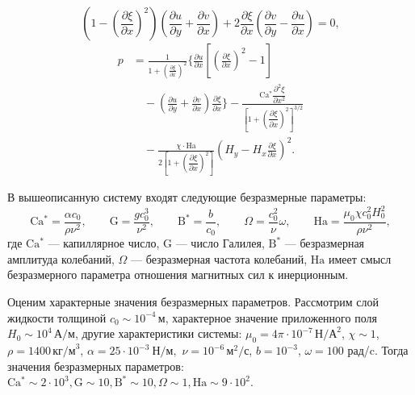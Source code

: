 \documentclass[12pt,a4paper]{article}
\begin{document}
\begin{equation}
\left(
1-
\left(\frac{\partial \xi}{\partial x}\right)^2
\right)
\left(
\frac{\partial u}{\partial y}
+
\frac{\partial v}{\partial x}
\right)
+
2\frac{\partial \xi}{\partial x}
\left(
\frac{\partial v}{\partial y}
-
\frac{\partial u}{\partial x}
\right)
=0,
\end{equation}
\begin{equation}\label{eq:bc_free_surface_ferro}
	\begin{aligned}
		p
		&=
		\frac{1}
		{1+\left(\frac{\partial \xi}{\partial x}\right)^2}
		\Bigg\{
		\frac{\partial u}{\partial x}
		\left[
		\left(\frac{\partial \xi}{\partial x}\right)^2-1
		\right]
		\\
		&\quad
		-
		\left(
		\frac{\partial u}{\partial y}
		+
		\frac{\partial v}{\partial x}
		\right)
		\frac{\partial \xi}{\partial x}
		\Bigg\}
		-
		\frac{
			\mathrm{Ca^*}\dfrac{\partial^2\xi}{\partial x^2}
		}{
			\left[
			1+
			\left(\dfrac{\partial \xi}{\partial x}\right)^2
			\right]^{3/2}
		}
		\\
		&\quad
		-
		\frac{\chi\cdot \mathrm{Ha}}
		{
			2\left[
			1+
			\left(\dfrac{\partial \xi}{\partial x}\right)^2
			\right]
		}
		\left(
		H_y-H_x\frac{\partial \xi}{\partial x}
		\right)^2.
	\end{aligned}
\end{equation}

В вышеописанную систему входят следующие безразмерные параметры:
\[
\mathrm{Ca^*} = \frac{\alpha c_0}{\rho \nu^2},
\qquad
\mathrm{G} = \frac{g c_0^3}{\nu^2},
\qquad
\mathrm{B}^* = \frac{b}{c_0},
\qquad
\Omega = \frac{c_0^2}{\nu}\omega,
\qquad
\mathrm{Ha} = \frac{\mu_0 \chi c_0^2 H_0^2}{\rho \nu^2},
\]
где \(\mathrm{Ca^*}\) --- капиллярное число, \(\mathrm{G}\) --- число Галилея, 
\(\mathrm{B}^*\) --- безразмерная амплитуда колебаний, 
\(\Omega\) --- безразмерная частота колебаний, \(\mathrm{Ha}\) имеет смысл 
безразмерного параметра отношения магнитных сил к инерционным. 

Оценим характерные значения безразмерных параметров. Рассмотрим слой жидкости толщиной \(c_0 \sim 10^{-4}\,\text{м}\), характерное значение приложенного поля \(H_0 \sim 10^4\,\text{А/м}\), другие характеристики системы:  \(\mu_0 = 4 \pi \cdot10^{-7}\,\text{Н/А}^2\), \(\chi \sim 1\), \(\rho = 1400\,\text{кг/м}^3\), $\alpha = 25 \cdot 10^{-3}~\text{Н/м},$ \(\nu =10^{-6}\,\text{м}^2/\text{с}\), $b=10^{-3}$, $\omega=100$ рад/c. Тогда значения безразмерных параметров: $\mathrm{Ca^*} \sim 2 \cdot 10^3, \mathrm{G} \sim 10, \mathrm{B}^{*} \sim 10, \Omega \sim 1, \mathrm{Ha} \sim 9 \cdot 10^2$. 
\end{document}
